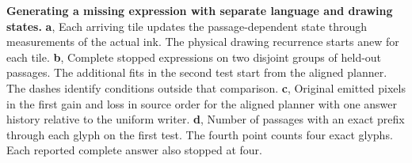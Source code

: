 \textbf{Generating a missing expression with separate language and drawing states.}
\textbf{a}, Each arriving tile updates the passage-dependent state through measurements of the actual ink. The physical drawing recurrence starts anew for each tile.
\textbf{b}, Complete stopped expressions on two disjoint groups of held-out passages. The additional fits in the second test start from the aligned planner. The dashes identify conditions outside that comparison.
\textbf{c}, Original emitted pixels in the first gain and loss in source order for the aligned planner with one answer history relative to the uniform writer.
\textbf{d}, Number of passages with an exact prefix through each glyph on the first test. The fourth point counts four exact glyphs. Each reported complete answer also stopped at four.

